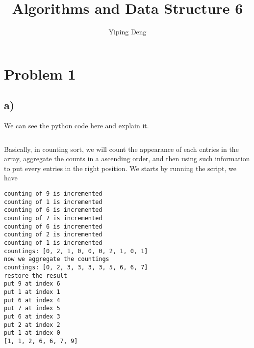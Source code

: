 \documentclass{article}
\newcommand{\hwnumber}{6}
\begin{document}
\title{Algorithms and Data Structure \hwnumber}
\author{Yiping Deng}
\maketitle
\thispagestyle{fancy}
\section*{Problem 1}
\subsection*{a)}
We can see the python code here and explain it.
\inputminted{Python}{counting_sort.py}
Basically, in counting sort, we will count the appearance of
each entries in the array, aggregate the counts in a ascending
order, and then using such information to put every entries
in the right position.
We starts by running the script, we have
\begin{verbatim}
counting of 9 is incremented
counting of 1 is incremented
counting of 6 is incremented
counting of 7 is incremented
counting of 6 is incremented
counting of 2 is incremented
counting of 1 is incremented
countings: [0, 2, 1, 0, 0, 0, 2, 1, 0, 1]
now we aggregate the countings
countings: [0, 2, 3, 3, 3, 3, 5, 6, 6, 7]
restore the result
put 9 at index 6
put 1 at index 1
put 6 at index 4
put 7 at index 5
put 6 at index 3
put 2 at index 2
put 1 at index 0
[1, 1, 2, 6, 6, 7, 9]
\end{verbatim}
\end{document}
